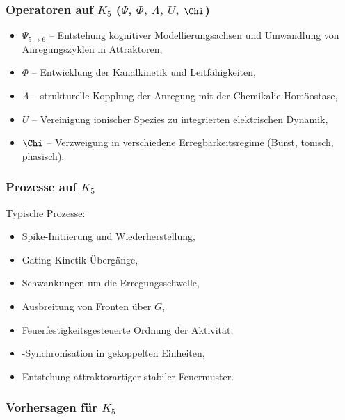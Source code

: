 \subsubsection{Operatoren auf \texorpdfstring{$K_5$}{K_5} (\texorpdfstring{$\Psi$}{\Psi}, \texorpdfstring{$\Phi$}{\Phi}, \texorpdfstring{$\Lambda$}{\Lambda}, \texorpdfstring{$U$}{U}, \texorpdfstring{$\Chi$}{\Chi})}

\begin{itemize}
    \item $\Psi_{5\to6}$ – Entstehung kognitiver Modellierungsachsen und
          Umwandlung von Anregungszyklen in Attraktoren,
    \item $\Phi$ – Entwicklung der Kanalkinetik und Leitfähigkeiten,
    \item $\Lambda$ – strukturelle Kopplung der Anregung mit der Chemikalie
          Homöostase,
    \item $U$ – Vereinigung ionischer Spezies zu integrierten elektrischen
          Dynamik,
    \item $\Chi$ – Verzweigung in verschiedene Erregbarkeitsregime (Burst,
          tonisch, phasisch).
\end{itemize}

\subsubsection{Prozesse auf \texorpdfstring{$K_5$}{K_5}}

Typische Prozesse:
\begin{itemize}
    \item Spike-Initiierung und Wiederherstellung,
    \item Gating-Kinetik-Übergänge,
    \item Schwankungen um die Erregungsschwelle,
    \item Ausbreitung von Fronten über $G$,
    \item Feuerfestigkeitsgesteuerte Ordnung der Aktivität,
    \item-Synchronisation in gekoppelten Einheiten,
    \item Entstehung attraktorartiger stabiler Feuermuster.
\end{itemize}

\subsubsection{Vorhersagen für \texorpdfstring{$K_5$}{K_5}}

